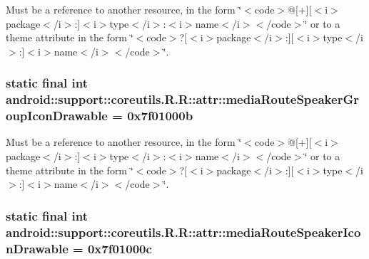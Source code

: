 Must be a reference to another resource, in the form \char`\"{}$<$code$>$@\mbox{[}+\mbox{]}\mbox{[}$<$i$>$package$<$/i$>$:\mbox{]}$<$i$>$type$<$/i$>$:$<$i$>$name$<$/i$>$$<$/code$>$\char`\"{} or to a theme attribute in the form \char`\"{}$<$code$>$?\mbox{[}$<$i$>$package$<$/i$>$:\mbox{]}\mbox{[}$<$i$>$type$<$/i$>$:\mbox{]}$<$i$>$name$<$/i$>$$<$/code$>$\char`\"{}. \hypertarget{classandroid_1_1support_1_1coreutils_1_1_r_1_1attr_7628dc1743155381dab9d3d6b9370c14}{
\subsubsection[{mediaRouteSpeakerGroupIconDrawable}]{\setlength{\rightskip}{0pt plus 5cm}static final int android::support::coreutils.R.R::attr::mediaRouteSpeakerGroupIconDrawable = 0x7f01000b}}
\label{classandroid_1_1support_1_1coreutils_1_1_r_1_1attr_7628dc1743155381dab9d3d6b9370c14}


Must be a reference to another resource, in the form \char`\"{}$<$code$>$@\mbox{[}+\mbox{]}\mbox{[}$<$i$>$package$<$/i$>$:\mbox{]}$<$i$>$type$<$/i$>$:$<$i$>$name$<$/i$>$$<$/code$>$\char`\"{} or to a theme attribute in the form \char`\"{}$<$code$>$?\mbox{[}$<$i$>$package$<$/i$>$:\mbox{]}\mbox{[}$<$i$>$type$<$/i$>$:\mbox{]}$<$i$>$name$<$/i$>$$<$/code$>$\char`\"{}. \hypertarget{classandroid_1_1support_1_1coreutils_1_1_r_1_1attr_c61d03b96a329c4f9d92922dc17db932}{
\subsubsection[{mediaRouteSpeakerIconDrawable}]{\setlength{\rightskip}{0pt plus 5cm}static final int android::support::coreutils.R.R::attr::mediaRouteSpeakerIconDrawable = 0x7f01000c}}
\label{classandroid_1_1support_1_1coreutils_1_1_r_1_1attr_c61d03b96a329c4f9d92922dc17db932}


